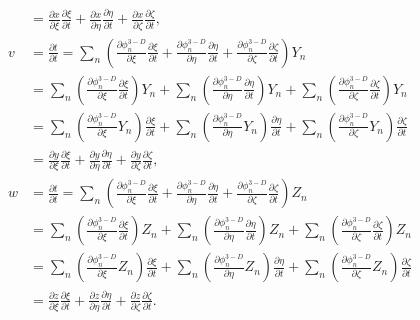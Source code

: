 \begin{spacing}{1.5}
\begin{equation*}
\begin{aligned}
			&= \frac{\partial x}{\partial \xi}\frac{\partial \xi}{\partial t}+\frac{\partial x}{\partial \eta}\frac{\partial \eta}{\partial t}+\frac{\partial x}{\partial \zeta}\frac{\partial \zeta}{\partial t}, \\
			v &= \frac{\partial t}{\partial t} = \sum_n \left(\frac{\partial \phi_n^{3-D}}{\partial \xi}\frac{\partial \xi}{\partial t}+\frac{\partial \phi_n^{3-D}}{\partial \eta}\frac{\partial \eta}{\partial t}+\frac{\partial \phi_n^{3-D}}{\partial \zeta}\frac{\partial \zeta}{\partial t}\right)Y_n \\
			&= \sum_n \left(\frac{\partial \phi_n^{3-D}}{\partial \xi}\frac{\partial \xi}{\partial t}\right)Y_n + \sum_n \left(\frac{\partial \phi_n^{3-D}}{\partial \eta}\frac{\partial \eta}{\partial t}\right)Y_n + \sum_n \left(\frac{\partial \phi_n^{3-D}}{\partial \zeta}\frac{\partial \zeta}{\partial t}\right)Y_n \\
			&= \sum_n \left(\frac{\partial \phi_n^{3-D}}{\partial \xi}Y_n\right)\frac{\partial \xi}{\partial t} + \sum_n \left(\frac{\partial \phi_n^{3-D}}{\partial \eta}Y_n\right)\frac{\partial \eta}{\partial t}+ \sum_n \left(\frac{\partial \phi_n^{3-D}}{\partial \zeta}Y_n\right)\frac{\partial \zeta}{\partial t}\\
			&= \frac{\partial y}{\partial \xi}\frac{\partial \xi}{\partial t}+\frac{\partial y}{\partial \eta}\frac{\partial \eta}{\partial t}+\frac{\partial y}{\partial \zeta}\frac{\partial \zeta}{\partial t}, \\
			w &= \frac{\partial t}{\partial t} = \sum_n \left(\frac{\partial \phi_n^{3-D}}{\partial \xi}\frac{\partial \xi}{\partial t}+\frac{\partial \phi_n^{3-D}}{\partial \eta}\frac{\partial \eta}{\partial t}+\frac{\partial \phi_n^{3-D}}{\partial \zeta}\frac{\partial \zeta}{\partial t}\right)Z_n \\
			&= \sum_n \left(\frac{\partial \phi_n^{3-D}}{\partial \xi}\frac{\partial \xi}{\partial t}\right)Z_n + \sum_n \left(\frac{\partial \phi_n^{3-D}}{\partial \eta}\frac{\partial \eta}{\partial t}\right)Z_n + \sum_n \left(\frac{\partial \phi_n^{3-D}}{\partial \zeta}\frac{\partial \zeta}{\partial t}\right)Z_n \\
			&= \sum_n \left(\frac{\partial \phi_n^{3-D}}{\partial \xi}Z_n\right)\frac{\partial \xi}{\partial t} + \sum_n \left(\frac{\partial \phi_n^{3-D}}{\partial \eta}Z_n\right)\frac{\partial \eta}{\partial t}+ \sum_n \left(\frac{\partial \phi_n^{3-D}}{\partial \zeta}Z_n\right)\frac{\partial \zeta}{\partial t}\\
			&= \frac{\partial z}{\partial \xi}\frac{\partial \xi}{\partial t}+\frac{\partial z}{\partial \eta}\frac{\partial \eta}{\partial t}+\frac{\partial z}{\partial \zeta}\frac{\partial \zeta}{\partial t}.

\end{aligned}
\end{equation*}
\end{spacing}
